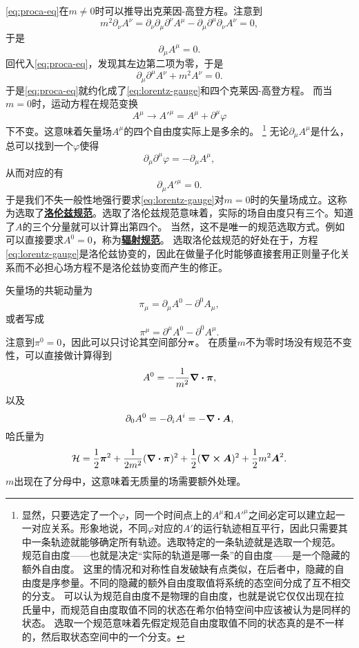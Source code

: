 \documentclass[hyperref, UTF8, a4paper]{ctexart}
\newcommand{\concept}[1]{\underline{\textbf{#1}}}
\begin{document}
\eqref{eq:proca-eq}在$m \neq 0$时可以推导出克莱因-高登方程。注意到
\[
    m^2 \partial_\nu A^\nu = \partial_\nu \partial_\mu \partial^\nu A^\mu - \partial_\mu \partial^\mu \partial_\nu A^\nu = 0,
\]
于是
\begin{equation}
    \partial_\mu A^\mu = 0.
    \label{eq:lorentz-gauge}
\end{equation}
回代入\eqref{eq:proca-eq}，发现其左边第二项为零，于是
\[
    \partial_\mu \partial^\mu A^\nu + m^2 A^\nu = 0.
\]
于是\eqref{eq:proca-eq}就约化成了\eqref{eq:lorentz-gauge}和四个克莱因-高登方程。
而当$m=0$时，运动方程在规范变换
\begin{equation}
    A^\mu \longrightarrow {A'}^\mu = A^\mu + \partial^\mu \varphi
\end{equation}
下不变。这意味着矢量场$A^\mu$的四个自由度实际上是多余的。%
\footnote{显然，只要选定了一个$\varphi$，同一个时间点上的$A^\mu$和${A'}^\mu$之间必定可以建立起一一对应关系。形象地说，不同$\varphi$对应的$A'$的运行轨迹相互平行，因此只需要其中一条轨迹就能够确定所有轨迹。选取特定的一条轨迹就是选取一个规范。
规范自由度——也就是决定“实际的轨道是哪一条”的自由度——是一个隐藏的额外自由度。
这里的情况和对称性自发破缺有点类似，在后者中，隐藏的自由度是序参量。不同的隐藏的额外自由度取值将系统的态空间分成了互不相交的分支。
可以认为规范自由度不是物理的自由度，也就是说它仅仅出现在拉氏量中，而规范自由度取值不同的状态在希尔伯特空间中应该被认为是同样的状态。
选取一个规范意味着先假定规范自由度取值不同的状态真的是不一样的，然后取状态空间中的一个分支。}%
无论$\partial_\mu A^\mu$是什么，总可以找到一个$\varphi$使得
\[
    \partial_\mu \partial^\mu \varphi = - \partial_\mu A^\mu,
\]
从而对应的有
\[
    \partial_\mu {A'}^\mu = 0.
\]
于是我们不失一般性地强行要求\eqref{eq:lorentz-gauge}对$m=0$时的矢量场成立。这称为选取了\concept{洛伦兹规范}。选取了洛伦兹规范意味着，实际的场自由度只有三个。知道了$A$的三个分量就可以计算出第四个。
当然，这不是唯一的规范选取方式。例如可以直接要求$A^0 = 0$，称为\concept{辐射规范}。
选取洛伦兹规范的好处在于，方程\eqref{eq:lorentz-gauge}是洛伦兹协变的，因此在做量子化时能够直接套用正则量子化关系而不必担心场方程不是洛伦兹协变而产生的修正。

矢量场的共轭动量为
\[
    \pi_\mu = \partial_\mu A^0 - \partial^0 A_\mu,
\]
或者写成
\begin{equation}
    \pi^\mu = \partial^\mu A^0 - \partial^0 A^\mu.
\end{equation}
注意到$\pi^0 = 0$，因此可以只讨论其空间部分$\vb*{\pi}$。
在质量$m$不为零时场没有规范不变性，可以直接做计算得到
\begin{equation}
    A^0 = - \frac{1}{m^2} \div{\vb*{\pi}},
\end{equation}
以及
\begin{equation}
    \partial_0 A^0 = - \partial_i A^i = - \div{\vb*{A}},
\end{equation}
哈氏量为
\begin{equation}
    \mathcal{H} = \frac{1}{2} \vb*{\pi}^2 + \frac{1}{2m^2} (\div{\vb*{\pi}})^2 + \frac{1}{2} (\curl{\vb*{A}})^2 + \frac{1}{2} m^2 \vb*{A}^2.
\end{equation}
$m$出现在了分母中，这意味着无质量的场需要额外处理。
\end{document}
